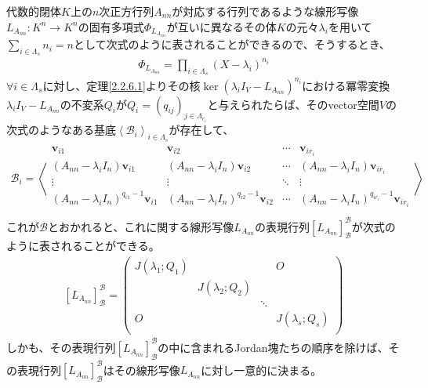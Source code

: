 \documentclass[dvipdfmx]{jsarticle}
\begin{document}
\begin{thm}\label{2.2.6.2}
代数的閉体$K$上の$n$次正方行列$A_{nn}$が対応する行列であるような線形写像$L_{A_{nn}}:K^{n} \rightarrow K^{n}$の固有多項式$\varPhi_{L_{A_{nn}}}$が互いに異なるその体$K$の元々$\lambda_{i}$を用いて$\sum_{i \in \varLambda_{s}} n_{i} = n$として次式のように表されることができるので、そうするとき、
\begin{align*}
\varPhi_{L_{A_{nn}}} = \prod_{i \in \varLambda_{s}} \left( X - \lambda_{i} \right)^{n_{i}}
\end{align*}
$\forall i \in \varLambda_{s}$に対し、定理\ref{2.2.6.1}よりその核$\ker\left( \lambda_{i}I_{V} - L_{A_{nn}} \right)^{n_{i}}$における冪零変換$\lambda_{i}I_{V} - L_{A_{nn}}$の不変系$Q_{i}$が$Q_{i} = \left( q_{ij} \right)_{j \in \varLambda_{r_{i}}}$と与えられたらば、そのvector空間$V$の次式のようなある基底$\left\langle \mathcal{B}_{i} \right\rangle_{i \in \varLambda_{s}}$が存在して、
\begin{align*}
\mathcal{B}_{i} = \left\langle \begin{matrix}
\mathbf{v}_{i1} & \mathbf{v}_{i2} & \cdots & \mathbf{v}_{ir_{i}} \\
\left( A_{nn} - \lambda_{i}I_{n} \right)\mathbf{v}_{i1} & \left( A_{nn} - \lambda_{i}I_{n} \right)\mathbf{v}_{i2} & \cdots & \left( A_{nn} - \lambda_{i}I_{n} \right)\mathbf{v}_{ir_{i}} \\
 \vdots & \vdots & \ddots & \vdots \\
\left( A_{nn} - \lambda_{i}I_{n} \right)^{q_{i1} - 1}\mathbf{v}_{i1} & \left( A_{nn} - \lambda_{i}I_{n} \right)^{q_{i2} - 1}\mathbf{v}_{i2} & \cdots & \left( A_{nn} - \lambda_{i}I_{n} \right)^{q_{ir_{i}} - 1}\mathbf{v}_{ir_{i}} \\
\end{matrix} \right\rangle
\end{align*}
これが$\mathcal{B}$とおかれると、これに関する線形写像$L_{A_{nn}}$の表現行列$\left[ L_{A_{nn}} \right]_{\mathcal{B}}^{\mathcal{B}}$が次式のように表されることができる。
\begin{align*}
\left[ L_{A_{nn}} \right]_{\mathcal{B}}^{\mathcal{B}} = \begin{pmatrix}
J\left( \lambda_{1};Q_{1} \right) & \  & \  & O \\
\  & J\left( \lambda_{2};Q_{2} \right) & \  & \  \\
\  & \  & \ddots & \  \\
O & \  & \  & J\left( \lambda_{s};Q_{s} \right) \\
\end{pmatrix}
\end{align*}
しかも、その表現行列$\left[ L_{A_{nn}} \right]_{\mathcal{B}}^{\mathcal{B}}$の中に含まれるJordan塊たちの順序を除けば、その表現行列$\left[ L_{A_{nn}} \right]_{\mathcal{B}}^{\mathcal{B}}$はその線形写像$L_{A_{nn}}$に対し一意的に決まる。
\end{thm}
\end{document}
